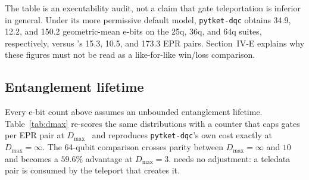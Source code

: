 The table is an executability audit, not a claim that gate teleportation is
inferior in general.  Under its more permissive default model,
\texttt{pytket-dqc} obtains 34.9, 12.2, and 150.2 geometric-mean e-bits on
the 25q, 36q, and 64q suites, respectively, versus \dSABRE{}'s 15.3, 10.5,
and 173.3 EPR pairs.  Section~IV-E explains why these figures must not be
read as a like-for-like win/loss comparison.

\subsection{Entanglement lifetime}
\label{app:dmax}
Every e-bit count above assumes an unbounded entanglement lifetime.
Table~\ref{tab:dmax} re-scores the same distributions with a counter that
caps gates per EPR pair at $D_{\max}$~\cite{bandini2026optimized} and
reproduces \texttt{pytket-dqc}'s own cost exactly at $D_{\max}{=}\infty$.  The 64-qubit comparison crosses
parity between $D_{\max}{=}\infty$ and $10$ and becomes a $59.6\%$
\dSABRE{} advantage at $D_{\max}{=}3$.  \dSABRE{} needs no adjustment: a
teledata pair is consumed by the teleport that creates it.


